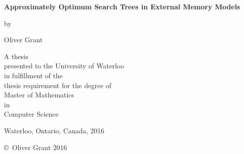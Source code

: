 \pagestyle{empty}

\begin{titlepage}
        \begin{center}
        \vspace*{1.0cm}

        \Huge
        {\bf Approximately Optimum Search Trees in External Memory Models }

        \vspace*{1.0cm}

        \normalsize
        by \\

        \vspace*{1.0cm}

        \Large
        Oliver Grant \\

        \vspace*{3.0cm}

        \normalsize
        A thesis \\
        presented to the University of Waterloo \\ 
        in fulfillment of the \\
        thesis requirement for the degree of \\
        Master of Mathematics \\
        in \\
        Computer Science \\

        \vspace*{2.0cm}

        Waterloo, Ontario, Canada, 2016 \\

        \vspace*{1.0cm}

        \copyright\ Oliver Grant 2016 \

        \end{center}
\end{titlepage}

\pagestyle{plain}
\setcounter{page}{2}

